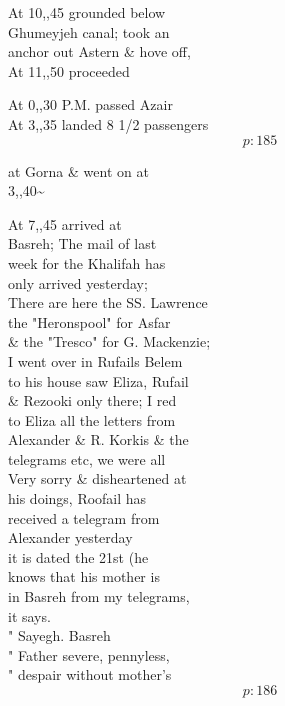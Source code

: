 \documentclass{report}
\begin{document}
	\par{
 	At 10,,45 grounded below\ \\Ghumeyjeh canal; took an\ \\anchor out Astern \& hove off,\ \\At 11,,50 proceeded\ \\
	}

	\par{
 	At 0,,30 P.M. passed Azair\ \\At 3,,35 landed 8 1/2 passengers\ \\
  \[p: 185 \]

	}


	\par{
 	at Gorna \& went on at\ \\3,,40\~{}\ \\
	}

	\par{
 	At 7,,45 arrived at\ \\Basreh; The mail of last\ \\week for the Khalifah has\ \\only arrived yesterday;\ \\There are here the SS. Lawrence\ \\the "Heronspool" for Asfar\ \\\& the "Tresco" for G. Mackenzie;\ \\I went over in Rufails Belem\ \\to his house saw Eliza, Rufail\ \\\& Rezooki only there; I red\ \\to Eliza all the letters from\ \\Alexander \& R. Korkis \& the\ \\telegrams etc, we were all\ \\Very sorry \& disheartened at\ \\his doings, Roofail has\ \\received a telegram from\ \\Alexander yesterday\ \\it is dated the 21st (he\ \\knows that his mother is\ \\in Basreh from my telegrams,\ \\it says.\ \\" Sayegh. Basreh\ \\" Father severe, pennyless,\ \\" despair without mother's\ \\
  \[p: 186 \]

	}
\end{document}
